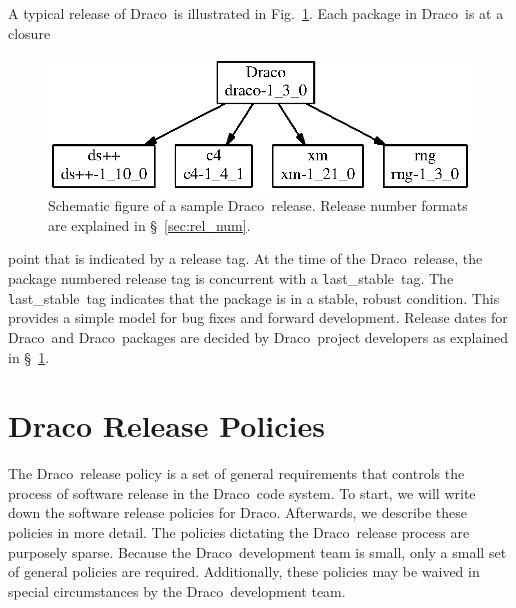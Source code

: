 \documentclass[11pt]{nmemo}
\newcommand{\draco}{{\normalfont\normalsize\textsf Draco}}
\newcommand{\stable}{{\normalfont\normalsize\texttt last\_stable}}
\begin{document}
A typical release of \draco\ is illustrated in
Fig.~\ref{fig:drelease}.  Each package in \draco\ is at a closure
\begin{figure}
  \centerline{\includegraphics{drelease.eps}}
  \caption{Schematic figure of a sample \draco\ release.  Release
    number formats are explained in \S~\ref{sec:rel_num}.}
  \label{fig:drelease}
\end{figure}
point that is indicated by a release tag. At the time of the \draco\ 
release, the package numbered release tag is concurrent with a
\stable\ tag.  The \stable\ tag indicates that the package is in a
stable, robust condition.  This provides a simple model for bug fixes
and forward development.  Release dates for \draco\ and \draco\ 
packages are decided by \draco\ project developers as explained in
\S~\ref{sec:policy}.

 
\section{Draco Release Policies}
\label{sec:policy}

The \draco\ release policy is a set of general requirements that
controls the process of software release in the \draco\ code system.
To start, we will write down the software release policies for \draco.
Afterwards, we describe these policies in more detail.  The policies
dictating the \draco\ release process are purposely sparse.  Because
the \draco\ development team is small, only a small set of general
policies are required.  Additionally, these policies may be waived in
special circumstances by the \draco\ development team.
\end{document}
